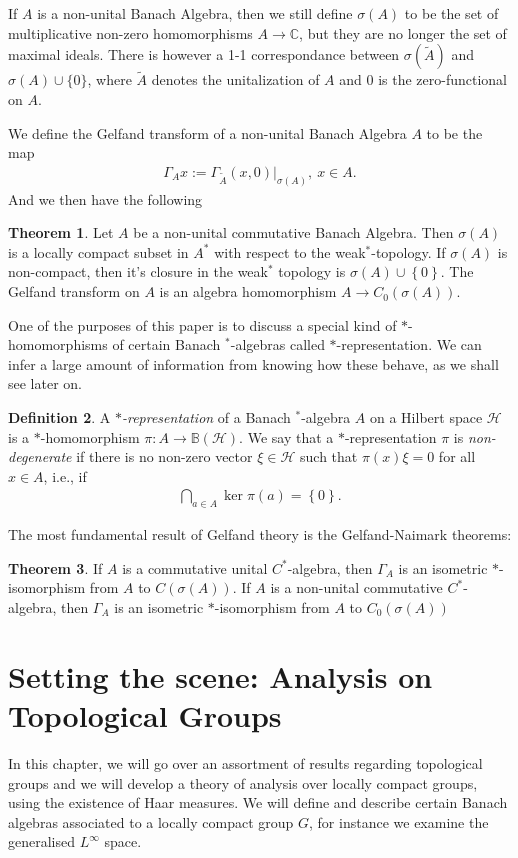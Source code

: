\documentclass[10pt,twoside,openany,final]{memoir}
\theoremstyle{definition}
\newtheorem{theorem}{Theorem}[chapter]
\newtheorem{definition}[theorem]{Definition}
\theoremstyle{Break}
\newcommand{\C}{\mathbb{C}}
\renewcommand{\H}{\mathcal{H}}
\begin{document}
If $A$ is a non-unital Banach Algebra, then we still define $\sigma(A)$ to be the set of multiplicative non-zero homomorphisms $A \to \C$, but they are no longer the set of maximal ideals. There is however a 1-1 correspondance between $\sigma(\tilde{A})$ and $\sigma(A) \cup \{0\}$, where $\tilde{A}$ denotes the unitalization of $A$ and $0$ is the zero-functional on $A$. 

We define the Gelfand transform of a non-unital Banach Algebra $A$ to be the map 
\begin{align*}
	\Gamma_A x := \Gamma_{\tilde{A}}(x,0)|_{\sigma(A)}, \ x \in A.
\end{align*}
And we then have the following
\begin{theorem}
	Let $A$ be a non-unital commutative Banach Algebra. Then $\sigma(A)$ is a locally compact subset in $A^*$ with respect to the weak$^*$-topology. If $\sigma(A)$ is non-compact, then it's closure in the weak$^*$ topology is $\sigma(A) \cup \left\{ 0 \right\}$. The Gelfand transform on $A$ is an algebra homomorphism $A \to C_0(\sigma(A))$.
	\label{1.30}
\end{theorem}
One of the purposes of this paper is to discuss a special kind of $*$-homomorphisms of certain Banach $^*$-algebras called $*$-representation. We can infer a large amount of information from knowing how these behave, as we shall see later on.
\begin{definition}
	A \emph{$*$-representation} of a Banach $^*$-algebra $A$ on a Hilbert space $\H$ is a $*$-homomorphism $\pi \colon A \to \mathbb{B}(\H)$. We say that a $*$-representation $\pi$ is \emph{non-degenerate} if there is no non-zero vector $\xi \in \H$ such that $\pi(x)\xi=0$ for all $x \in A$, i.e., if 
	\begin{align*}
		\bigcap_{a \in A} \ker\pi(a)=\left\{ 0 \right\}.
	\end{align*}
\end{definition}
The most fundamental result of Gelfand theory is the Gelfand-Naimark theorems:
\begin{theorem}
	If $A$ is a commutative unital $C^*$-algebra, then $\Gamma_A$ is an isometric $*$-isomorphism from $A$ to $C(\sigma(A))$. If $A$ is a non-unital commutative $C^*$-algebra, then $\Gamma_A$ is an isometric $*$-isomorphism from $A$ to $C_0(\sigma(A))$
\end{theorem}


 
\chapter{Setting the scene: Analysis on Topological Groups}
In this chapter, we will go over an assortment of results regarding topological groups and we will develop a theory of analysis over locally compact groups, using the existence of Haar measures. We will define and describe certain Banach algebras associated to a locally compact group $G$, for instance we examine the generalised $L^\infty$ space.
\end{document}
